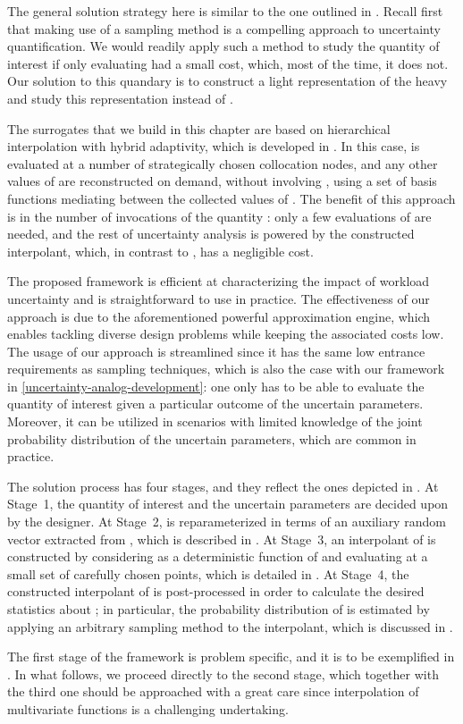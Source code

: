 The general solution strategy here is similar to the one outlined in
. Recall first that making use of a sampling method is a
compelling approach to uncertainty quantification. We would readily apply such a
method to study the quantity of interest \g if only evaluating \g had a small
cost, which, most of the time, it does not. Our solution to this quandary is to
construct a light representation of the heavy \g and study this representation
instead of \g.

The surrogates that we build in this chapter are based on hierarchical
interpolation with hybrid adaptivity, which is developed in \cite{klimke2006,
ma2009, jakeman2012}. In this case, \g is evaluated at a number of strategically
chosen collocation nodes, and any other values of \g are reconstructed on
demand, without involving \g, using a set of basis functions mediating between
the collected values of \g. The benefit of this approach is in the number of
invocations of the quantity \g: only a few evaluations of \g are needed, and the
rest of uncertainty analysis is powered by the constructed interpolant, which,
in contrast to \g, has a negligible cost.

The proposed framework is efficient at characterizing the impact of workload
uncertainty and is straightforward to use in practice. The effectiveness of our
approach is due to the aforementioned powerful approximation engine, which
enables tackling diverse design problems while keeping the associated costs low.
The usage of our approach is streamlined since it has the same low entrance
requirements as sampling techniques, which is also the case with our framework
in \cref{uncertainty-analog-development}: one only has to be able to evaluate
the quantity of interest given a particular outcome of the uncertain parameters.
Moreover, it can be utilized in scenarios with limited knowledge of the joint
probability distribution of the uncertain parameters, which are common in
practice.

The solution process has four stages, and they reflect the ones depicted in
. At Stage~1, the quantity of interest \g and the uncertain
parameters \vu are decided upon by the designer. At Stage~2, \g is
reparameterized in terms of an auxiliary random vector \vz extracted from \vu,
which is described in . At Stage~3, an interpolant of
\g is constructed by considering \g as a deterministic function of \vz and
evaluating \g at a small set of carefully chosen points, which is detailed in
. At Stage~4, the constructed interpolant of \g is
post-processed in order to calculate the desired statistics about \g; in
particular, the probability distribution of \g is estimated by applying an
arbitrary sampling method to the interpolant, which is discussed in
.

The first stage of the framework is problem specific, and it is to be
exemplified in . In what follows, we proceed directly to
the second stage, which together with the third one should be approached with a
great care since interpolation of multivariate functions is a challenging
undertaking.
